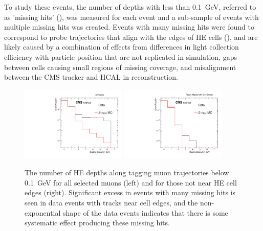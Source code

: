 To study these events, the number of depths with less than \SI{0.1}{\giga\eV}, referred to as 'missing hits' (), was measured for each event and a sub-sample of events with multiple missing hits was created. 
Events with many missing hits were found to correspond to probe trajectories that align with the edges of HE cells (), and are likely caused by a combination of effects from differences in light collection efficiency with particle position that are not replicated in simulation, gaps between cells causing small regions of missing coverage, and misalignment between the CMS tracker and HCAL in reconstruction.

\begin{figure}[htbp]
	\centering
	\includegraphics[width=0.45\textwidth]{figures/hcalAllMissingHits.pdf}
        \hspace{0.01\textwidth}
        \includegraphics[width=0.45\textwidth]{figures/hcalMissingHits.pdf}
        \caption[Missing muon hits in HE]{The number of HE depths along tagging muon trajectories below \SI{0.1}{\giga\eV} for all selected muons (left) and for those not near HE cell edges (right). Significant excess in events with many missing hits is seen in data events with tracks near cell edges, and the non-exponential shape of the data events indicates that there is some systematic effect producing these missing hits.}
        \label{fig:missingHits}
\end{figure}

